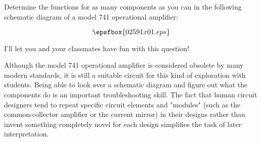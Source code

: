 

Determine the functions for as many components as you can in the following schematic diagram of a model 741 operational amplifier:

$$\epsfbox{02591x01.eps}$$







I'll let you and your classmates have fun with this question!







Although the model 741 operational amplifier is considered obsolete by many modern standards, it is still a suitable circuit for this kind of exploration with students.  Being able to look over a schematic diagram and figure out what the components do is an important troubleshooting skill.  The fact that human circuit designers tend to repeat specific circuit elements and "modules" (such as the common-collector amplifier or the current mirror) in their designs rather than invent something completely novel for each design simplifies the task of later interpretation.




